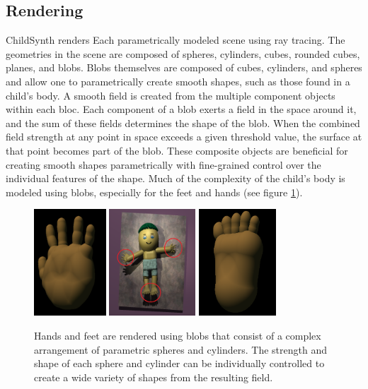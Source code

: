 \documentclass{article}
\begin{document}
\subsection{Rendering}

ChildSynth renders Each parametrically modeled scene using ray tracing. The geometries in the scene are composed of spheres, cylinders, cubes, rounded cubes, planes, and blobs. Blobs themselves are composed of cubes, cylinders, and spheres and allow one to parametrically create smooth shapes, such as those found in a child's body. A smooth field is created from the multiple component objects within each bloc. Each component of a blob exerts a field in the space around it, and the sum of these fields determines the shape of the blob. When the combined field strength at any point in space exceeds a given threshold value, the surface at that point becomes part of the blob. These composite objects are beneficial for creating smooth shapes parametrically with fine-grained control over the individual features of the shape. Much of the complexity of the child's body is modeled using blobs, especially for the feet and hands (see figure \ref{fig:hand_foot}). 

\begin{figure}[htbp]
    \centering
    \includegraphics[height=4cm]{plots/hand.png}
    \includegraphics[height=4cm]{plots/back.png}
    \includegraphics[height=4cm]{plots/foot.png}
    \caption{Hands and feet are rendered using blobs that consist of a complex arrangement of parametric spheres and cylinders. The strength and shape of each sphere and cylinder can be individually controlled to create a wide variety of shapes from the resulting field.}
    \label{fig:hand_foot}
\end{figure}
\end{document}
